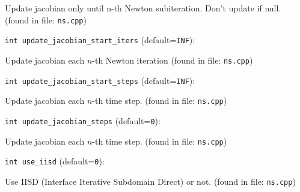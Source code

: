 Update jacobian only until n-th Newton subiteration. 
Don't update if null. 
 (found in file: \verb+ns.cpp+)
\item\verb+int update_jacobian_start_iters+ {\rm(default=\verb|INF|)}:

Update jacobian each $n$-th Newton iteration
 (found in file: \verb+ns.cpp+)
\item\verb+int update_jacobian_start_steps+ {\rm(default=\verb|INF|)}:

Update jacobian each $n$-th time step. 
 (found in file: \verb+ns.cpp+)
\item\verb+int update_jacobian_steps+ {\rm(default=\verb|0|)}:

Update jacobian each $n$-th time step. 
 (found in file: \verb+ns.cpp+)
\item\verb+int use_iisd+ {\rm(default=\verb|0|)}:

Use IISD (Interface Iterative Subdomain Direct) or not.
 (found in file: \verb+ns.cpp+)
